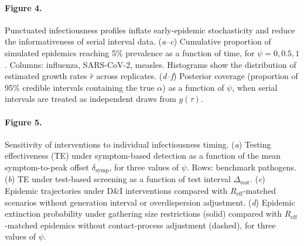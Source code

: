 \documentclass[10pt]{article}
\begin{document}
\paragraph{Figure 4.}
Punctuated infectiousness profiles inflate early-epidemic stochasticity and reduce the informativeness of serial interval data.
(\textit{a--c}) Cumulative proportion of simulated epidemics reaching 5\% prevalence as a function of time, for $\psi = 0, 0.5, 1$. Columns: influenza, SARS-CoV-2, measles. Histograms show the distribution of estimated growth rates $\hat{r}$ across replicates.
(\textit{d--f}) Posterior coverage (proportion of 95\% credible intervals containing the true $\alpha$) as a function of $\psi$, when serial intervals are treated as independent draws from $g(\tau)$.
\label{fig:timing_inference}

\paragraph{Figure 5.}
Sensitivity of interventions to individual infectiousness timing.
(\textit{a}) Testing effectiveness (TE) under symptom-based detection as a function of the mean symptom-to-peak offset $\delta_\text{symp}$, for three values of $\psi$. Rows: benchmark pathogens.
(\textit{b}) TE under test-based screening as a function of test interval $\Delta_\text{test}$.
(\textit{c}) Epidemic trajectories under D\&I interventions compared with $R_\text{eff}$-matched scenarios without generation interval or overdispersion adjustment.
(\textit{d}) Epidemic extinction probability under gathering size restrictions (solid) compared with $R_\text{eff}$-matched epidemics without contact-process adjustment (dashed), for three values of $\psi$.
\label{fig:interventions}
\end{document}
